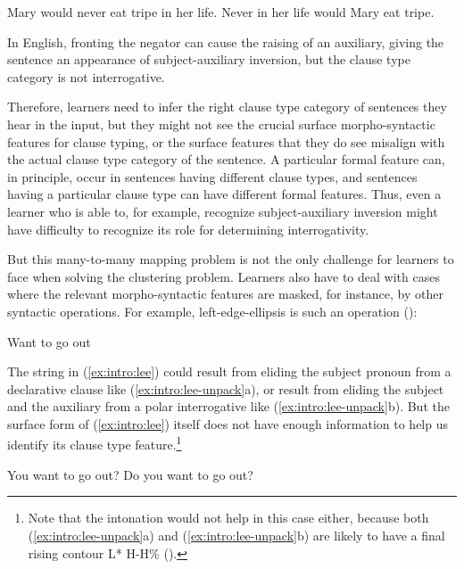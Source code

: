 \bxl\label{bg-syn:decreg}
Mary would never eat tripe in her life. 
\ex\label{bg-syn:decneg} Never in her life would Mary eat tripe.
\exl
\eex

In English, fronting the negator  can cause the raising of an auxiliary, giving the sentence an appearance of subject-auxiliary inversion, but the clause type category is not interrogative. %

Therefore, learners need to infer the right clause type category of sentences they hear in the input, but they might not see the crucial surface morpho-syntactic features for clause typing, or the surface features that they do see misalign with the actual clause type category of the sentence. A particular formal feature can, in principle, occur in sentences having different clause types, and sentences having a particular clause type can have different formal features. Thus, even a learner who is able to, for example, recognize subject-auxiliary inversion might have difficulty to recognize its role for determining interrogativity.

But this many-to-many mapping problem is not the only challenge for learners to face when solving the clustering problem. Learners also have to deal with cases where the relevant morpho-syntactic features are masked, for instance, by other syntactic operations. For example, left-edge-ellipsis is such an operation (\cite{zwickypullum1983leftedge}):

Want to go out
\eex

The string in (\ref{ex:intro:lee}) could result from eliding the subject pronoun from a declarative clause like (\ref{ex:intro:lee-unpack}a), or result from eliding the subject and the auxiliary from a polar interrogative like (\ref{ex:intro:lee-unpack}b). But the surface form of (\ref{ex:intro:lee}) itself does not have enough information to help us identify its clause type feature.\footnote{Note that the intonation would not help in this case either, because both (\ref{ex:intro:lee-unpack}a) and (\ref{ex:intro:lee-unpack}b) are likely to have a final rising contour L* H-H\% (\cite{gunlogson2008, jeong2018, goodhue2021rd}). } 

\bxl
You want to go out?
\ex Do you want to go out?
\exl
\eex


